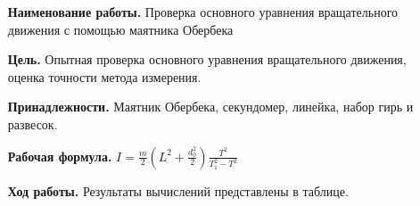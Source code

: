 \documentclass[otchet]{SCWorks}
\begin{document}

\date{2023}

\maketitle

\secNumbering

\newpage

\begin{enumerate}[leftmargin=3.5cm]
    \item[\bf Наименование работы.] Проверка основного уравнения вращательного движения с помощью маятника Обербека
    \item[\bf Цель.] Опытная проверка основного уравнения вращательного движения, оценка точности метода измерения.
    \item[\bf Принадлежности.] Маятник Обербека, секундомер, линейка, набор гирь и развесок.
    \item[\bf Рабочая формула.] $I = \frac m 2 \left( L^2 + \frac{d_0^2}{2}\right) \frac{T^2}{T_1^2 - T^2}$
    \item[\bf Ход работы.] Результаты вычислений представлены в таблице.
\end{enumerate}
\end{document}
